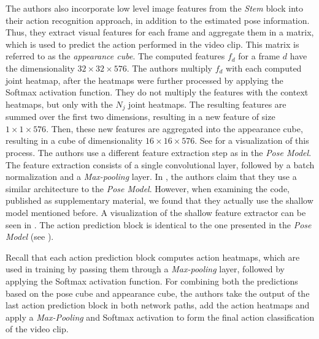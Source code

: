 The authors also incorporate low level image features from the \textit{Stem} block into their action recognition approach, in addition to the estimated pose information.
Thus, they extract visual features for each frame and aggregate them in a matrix, which is used to predict the action performed in the video clip.
This matrix is referred to as the \textit{appearance cube}.
The computed features $f_d$ for a frame $d$ have the dimensionality $32 \times 32 \times 576$.
The authors multiply $f_d$ with each computed joint heatmap, after the heatmaps were further processed by applying the Softmax activation function.
They do not multiply the features with the context heatmaps, but only with the $N_j$ joint heatmaps.
The resulting features are summed over the first two dimensions, resulting in a new feature of size $1 \times 1 \times 576$.
Then, these new features are aggregated into the appearance cube, resulting in a cube of dimensionality $16 \times 16 \times 576$.
See  for a visualization of this process.
The authors use a different feature extraction step as in the \textit{Pose Model}.
The feature extraction consists of a single convolutional layer, followed by a batch normalization and a \textit{Max-pooling} layer.
In \cite{luvizon_2d/3d_2018}, the authors claim that they use a similar architecture to the \textit{Pose Model}.
However, when examining the code, published as supplementary material, we found that they actually use the shallow model mentioned before.
A visualization of the shallow feature extractor can be seen in .
The action prediction block is identical to the one presented in the \textit{Pose Model} (see ).

Recall that each action prediction block computes action heatmaps, which are used in training by passing them through a \textit{Max-pooling} layer, followed by applying the Softmax activation function.
For combining both the predictions based on the pose cube and appearance cube, the authors take the output of the last action prediction block in both network paths, add the action heatmaps and apply a \textit{Max-Pooling} and Softmax activation to form the final action classification of the video clip.

